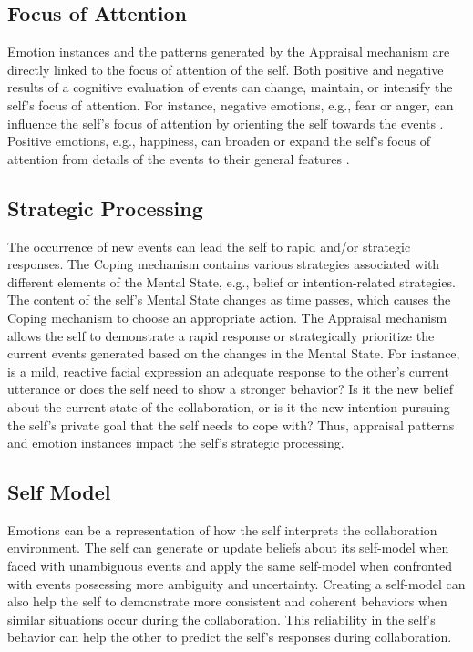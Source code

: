 \documentclass[12pt]{report}
\begin{document}
\subsection{Focus of Attention} Emotion instances and the patterns generated
by the Appraisal mechanism are directly linked to the focus of attention of the
self. Both positive and negative results of a cognitive evaluation of events can
change, maintain, or intensify the self's focus of attention. For instance,
negative emotions, e.g., fear or anger, can influence the self's focus of
attention by orienting the self towards the events
\cite{faucher:fear-attention}. Positive emotions, e.g., happiness, can broaden
or expand the self's focus of attention from details of the events to their
general features \cite{fredrickson:positive-emotion-attention}.

\subsection{Strategic Processing} The occurrence of new events can lead the
self to rapid and/or strategic responses. The Coping mechanism contains various
strategies associated with different elements of the Mental State, e.g.,
belief or intention-related strategies. The content of the self's Mental State
changes as time passes, which causes the Coping mechanism to choose an
appropriate action. The Appraisal mechanism allows the self to demonstrate a
rapid response or strategically prioritize the current events generated
based on the changes in the Mental State. For instance, is a mild, reactive
facial expression an adequate response to the other's current utterance or does
the self need to show a stronger behavior? Is it the new belief about the
current state of the collaboration, or is it the new intention pursuing the
self's private goal that the self needs to cope with? Thus, appraisal patterns
and emotion instances impact the self's strategic processing.

\subsection{Self Model} Emotions can be a representation of how the self
interprets the collaboration environment. The self can generate or update
beliefs about its self-model when faced with unambiguous events and apply the
same self-model when confronted with events possessing more ambiguity and
uncertainty. Creating a self-model can also help the self to demonstrate more
consistent and coherent behaviors when similar situations occur during the
collaboration. This reliability in the self's behavior can help the other to
predict the self's responses during collaboration.
\end{document}

